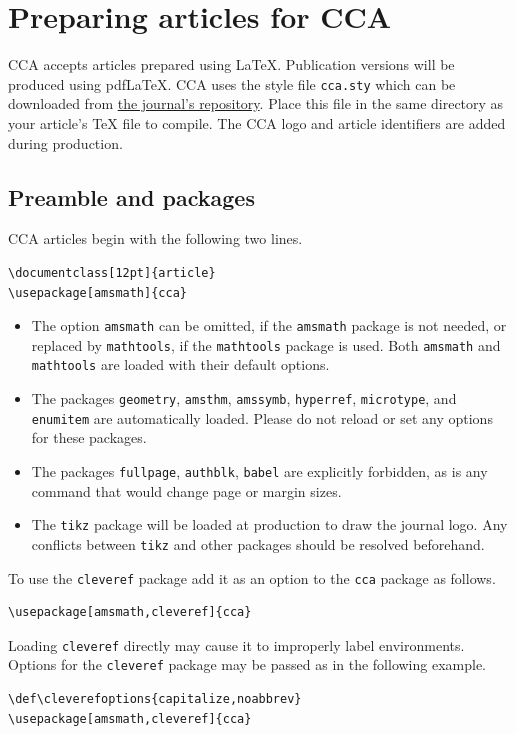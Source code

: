 \documentclass[12pt]{article}
\begin{document}
\section{Preparing articles for CCA}

CCA accepts articles prepared using LaTeX. Publication versions will
be produced using pdfLaTeX. CCA uses the style file \verb|cca.sty|
which can be downloaded from
\href{https://github.com/Combinatorial-Commutative-Algebra/CCA_Journal}{the
  journal's repository}. Place this file in the same directory as your
article's TeX file to compile. The CCA logo and article identifiers
are added during production.


\subsection{Preamble and packages}

CCA articles begin with the following two lines.
\begin{verbatim}
\documentclass[12pt]{article}
\usepackage[amsmath]{cca}
\end{verbatim}
\begin{itemize}
\item The option \verb|amsmath| can be omitted, if the
  \texttt{amsmath} package is not needed, or replaced by
  \verb|mathtools|, if the \texttt{mathtools} package is used.  Both
  \texttt{amsmath} and \texttt{mathtools} are loaded with their
  default options.
\item The packages \texttt{geometry}, \texttt{amsthm},
  \texttt{amssymb}, \texttt{hyperref}, \texttt{microtype}, and
  \texttt{enumitem} are automatically loaded. Please do not reload or
  set any options for these packages.
\item The packages \texttt{fullpage}, \texttt{authblk}, \texttt{babel}
  are explicitly forbidden, as is any command that would change page
  or margin sizes.
\item The \texttt{tikz} package will be loaded at production to draw
  the journal logo. Any conflicts between \texttt{tikz} and other
  packages should be resolved beforehand.
\end{itemize}
   

\begin{note}
  To use the \texttt{cleveref} package add it as an option to the
  \texttt{cca} package as follows.
\begin{verbatim}
\usepackage[amsmath,cleveref]{cca}
\end{verbatim}
  Loading \texttt{cleveref} directly may cause it to improperly label
  environments.  Options for the \texttt{cleveref} package may be
  passed as in the following example.
\begin{verbatim}
\def\cleverefoptions{capitalize,noabbrev}
\usepackage[amsmath,cleveref]{cca}
\end{verbatim}
\end{note}
\end{document}
